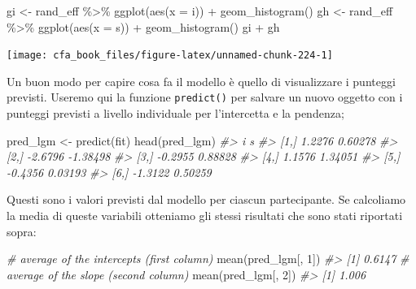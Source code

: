 \documentclass[
  11pt,
]{krantz}
\makeatletter
\newenvironment{Shaded}{\begin{snugshade}}{\end{snugshade}}
\newcommand{\AttributeTok}[1]{\textcolor[rgb]{0.61,0.61,0.61}{#1}}
\newcommand{\CommentTok}[1]{\textcolor[rgb]{0.37,0.37,0.37}{\textit{#1}}}
\newcommand{\DecValTok}[1]{\textcolor[rgb]{0.06,0.06,0.06}{#1}}
\newcommand{\FunctionTok}[1]{\textcolor[rgb]{0,0,0}{#1}}
\newcommand{\NormalTok}[1]{#1}
\newcommand{\OtherTok}[1]{\textcolor[rgb]{0.37,0.37,0.37}{#1}}
\newcommand{\SpecialCharTok}[1]{\textcolor[rgb]{0,0,0}{#1}}
\newenvironment{kframe}{%
\medskip{}
\setlength{\fboxsep}{.8em}
 \def\at@end@of@kframe{}%
 \ifinner\ifhmode%
  \def\at@end@of@kframe{\end{minipage}}%
  \begin{minipage}{\columnwidth}%
 \fi\fi%
 \def\FrameCommand##1{\hskip\@totalleftmargin \hskip-\fboxsep
 \colorbox{shadecolor}{##1}\hskip-\fboxsep
     \hskip-\linewidth \hskip-\@totalleftmargin \hskip\columnwidth}%
 \MakeFramed {\advance\hsize-\width
   \@totalleftmargin\z@ \linewidth\hsize
   \@setminipage}}%
 {\par\unskip\endMakeFramed%
 \at@end@of@kframe}
\renewenvironment{Shaded}{\begin{kframe}}{\end{kframe}}
\theoremstyle{definition}
\theoremstyle{definition}
\theoremstyle{definition}
\theoremstyle{definition}
\theoremstyle{remark}
\makeatother
\begin{document}
\begin{Shaded}
\begin{Highlighting}[]
\NormalTok{gi }\OtherTok{\textless{}{-}}\NormalTok{ rand\_eff }\SpecialCharTok{\%\textgreater{}\%}
  \FunctionTok{ggplot}\NormalTok{(}\FunctionTok{aes}\NormalTok{(}\AttributeTok{x =}\NormalTok{ i)) }\SpecialCharTok{+}
  \FunctionTok{geom\_histogram}\NormalTok{()}
\NormalTok{gh }\OtherTok{\textless{}{-}}\NormalTok{ rand\_eff }\SpecialCharTok{\%\textgreater{}\%}
  \FunctionTok{ggplot}\NormalTok{(}\FunctionTok{aes}\NormalTok{(}\AttributeTok{x =}\NormalTok{ s)) }\SpecialCharTok{+}
  \FunctionTok{geom\_histogram}\NormalTok{()}
\NormalTok{gi }\SpecialCharTok{+}\NormalTok{ gh}
\end{Highlighting}
\end{Shaded}

\begin{center}\texttt{[image: cfa\_book\_files/figure-latex/unnamed-chunk-224-1]} \end{center}

Un buon modo per capire cosa fa il modello è quello di visualizzare i punteggi previsti. Useremo qui la funzione \texttt{predict()} per salvare un nuovo oggetto con i punteggi previsti a livello individuale per l'intercetta e la pendenza;

\begin{Shaded}
\begin{Highlighting}[]
\NormalTok{pred\_lgm }\OtherTok{\textless{}{-}} \FunctionTok{predict}\NormalTok{(fit)}
\FunctionTok{head}\NormalTok{(pred\_lgm)}
\CommentTok{\#\textgreater{}            i        s}
\CommentTok{\#\textgreater{} [1,]  1.2276  0.60278}
\CommentTok{\#\textgreater{} [2,] {-}2.6796 {-}1.38498}
\CommentTok{\#\textgreater{} [3,] {-}0.2955  0.88828}
\CommentTok{\#\textgreater{} [4,]  1.1576  1.34051}
\CommentTok{\#\textgreater{} [5,] {-}0.4356  0.03193}
\CommentTok{\#\textgreater{} [6,] {-}1.3122  0.50259}
\end{Highlighting}
\end{Shaded}

Questi sono i valori previsti dal modello per ciascun partecipante. Se calcoliamo la media di queste variabili otteniamo gli stessi risultati che sono stati riportati sopra:

\begin{Shaded}
\begin{Highlighting}[]
\CommentTok{\# average of the intercepts (first column)}
\FunctionTok{mean}\NormalTok{(pred\_lgm[, }\DecValTok{1}\NormalTok{])}
\CommentTok{\#\textgreater{} [1] 0.6147}
\CommentTok{\# average of the slope (second column)}
\FunctionTok{mean}\NormalTok{(pred\_lgm[, }\DecValTok{2}\NormalTok{])}
\CommentTok{\#\textgreater{} [1] 1.006}
\end{Highlighting}
\end{Shaded}
\end{document}
